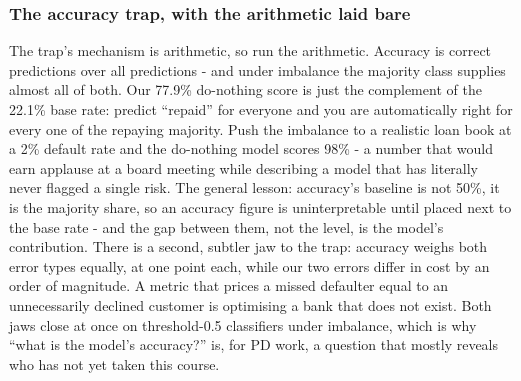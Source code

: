 \documentclass[11pt,a4paper]{article}
\begin{document}
\subsubsection{The accuracy trap, with the arithmetic laid bare}
The trap's mechanism is arithmetic, so run the arithmetic. Accuracy is
correct predictions over all predictions - and under imbalance the
majority class supplies almost all of both. Our 77.9\% do-nothing score
is just the complement of the 22.1\% base rate: predict ``repaid'' for
everyone and you are automatically right for every one of the repaying
majority. Push the imbalance to a realistic loan book at a 2\% default
rate and the do-nothing model scores 98\% - a number that would earn
applause at a board meeting while describing a model that has literally
never flagged a single risk. The general lesson: accuracy's baseline is
not 50\%, it is the majority share, so an accuracy figure is
uninterpretable until placed next to the base rate - and the gap
between them, not the level, is the model's contribution. There is a
second, subtler jaw to the trap: accuracy weighs both error types
equally, at one point each, while our two errors differ in cost by an
order of magnitude. A metric that prices a missed defaulter equal to an
unnecessarily declined customer is optimising a bank that does not
exist. Both jaws close at once on threshold-0.5 classifiers under
imbalance, which is why ``what is the model's accuracy?'' is, for PD
work, a question that mostly reveals who has not yet taken this course.
\end{document}
